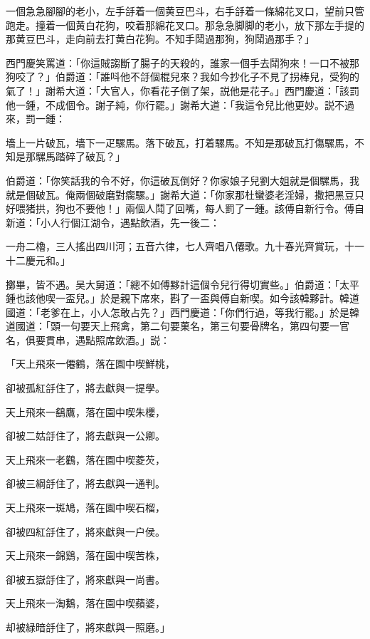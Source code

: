 \begin{myquote}
一個急急腳腳的老小，左手㧱着一個黄豆巴斗，右手㧱着一條綿花叉口，望前只管跑走。撞着一個黄白花狗，咬着那綿花叉口。那急急脚脚的老小，放下那左手提的那黄豆巴斗，走向前去打黄白花狗。不知手鬦過那狗，狗鬦過那手？」
\end{myquote}

西門慶笑罵道：「你這賊謅斷了腸子的天殺的，誰家一個手去鬦狗來！一口不被那狗咬了？」伯爵道：「誰呌他不㧱個棍兒來？我如今抄化子不見了拐棒兒，受狗的氣了！」謝希大道：「大官人，你看花子倒了架，説他是花子。」西門慶道：「該罰他一鍾，不成個令。謝子純，你行罷。」謝希大道：「我這令兒比他更妙。説不過來，罰一鍾：

\begin{myquote}
墻上一片破瓦，墻下一疋騾馬。落下破瓦，打着騾馬。不知是那破瓦打傷騾馬，不知是那騾馬踏碎了破瓦？」
\end{myquote}

伯爵道：「你笑話我的令不好，你這破瓦倒好？你家娘子兒劉大姐就是個騾馬，我就是個破瓦。俺兩個破磨對瘸騾。」謝希大道：「你家那杜蠻婆老淫婦，撒把黑豆只好喂猪拱，狗也不要他！」兩個人鬦了回嘴，每人罰了一鍾。該傅自新行令。傅自新道：「小人行個江湖令，遇點飲酒，先一後二：

\begin{myquote}
一舟二櫓，三人搖出四川河；五音六律，七人齊唱八僊歌。九十春光齊賞玩，十一十二慶元和。」
\end{myquote}

擲畢，皆不遇。吴大舅道：「總不如傅黟計這個令兒行得切實些。」伯爵道：「太平鍾也該他喫一盃兒。」於是親下席來，斟了一盃與傅自新喫。如今該韓夥計。韓道國道：「老爹在上，小人怎敢占先？」西門慶道：「你們行過，等我行罷。」於是韓道國道：「頭一句要天上飛禽，第二句要菓名，第三句要骨牌名，第四句要一官名，俱要貫串，遇點照席飲酒。」説：

\begin{myquote}
「天上飛來一僊鶴，落在園中喫鮮桃，

卻被孤紅㧱住了，將去獻與一提學。

天上飛來一鷂鷹，落在園中喫朱櫻，

卻被二姑㧱住了，將去獻與一公卿。

天上飛來一老鸛，落在園中喫菱芡，

卻被三綱㧱住了，將去獻與一通判。

天上飛來一斑鳩，落在園中喫石榴，

卻被四紅㧱住了，將來獻與一户侯。

天上飛來一錦鷄，落在園中喫苦株，

卻被五嶽㧱住了，將來獻與一尚書。

天上飛來一淘鵝，落在園中喫蘋婆，

却被緑暗㧱住了，將來獻與一照磨。」
\end{myquote}

